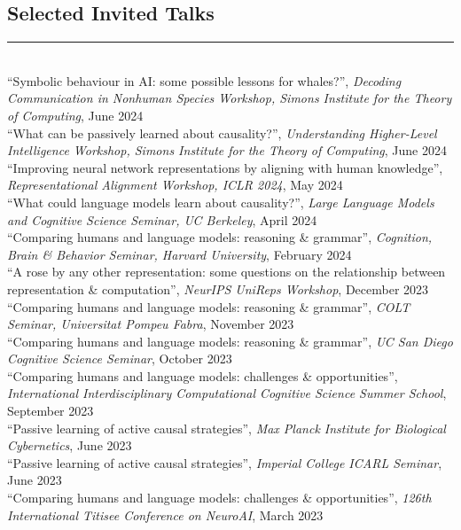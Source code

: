 \documentclass[margin]{res}
\begin{document}
\begin{resume}
{\vspace{1pt}\section{Selected Invited Talks} \vspace{-15pt} \rule{\textwidth}{0.5pt} \\[3pt]
{``Symbolic behaviour in AI: some possible lessons for whales?'',} \textit{Decoding Communication in Nonhuman Species Workshop, Simons Institute for the Theory of Computing}, June 2024\\[3pt]
{``What can be passively learned about causality?'',} \textit{Understanding Higher-Level Intelligence Workshop, Simons Institute for the Theory of Computing}, June 2024
{``Improving neural network representations by aligning with human knowledge'',} \textit{Representational Alignment Workshop, ICLR 2024}, May 2024\\[3pt] 
{``What could language models learn about causality?'',} \textit{Large Language Models and Cognitive Science Seminar, UC Berkeley}, April 2024\\[3pt] 
{``Comparing humans and language models: reasoning \& grammar'',} \textit{Cognition, Brain \& Behavior Seminar, Harvard University}, February 2024\\[3pt] 
{``A rose by any other representation: some questions on the relationship between representation \& computation'',} \textit{NeurIPS UniReps Workshop}, December 2023\\[3pt] 
{``Comparing humans and language models: reasoning \& grammar'',} \textit{COLT Seminar, Universitat Pompeu Fabra}, November 2023\\[3pt] 
{``Comparing humans and language models: reasoning \& grammar'',} \textit{UC San Diego Cognitive Science Seminar}, October 2023\\[3pt] 
{``Comparing humans and language models: challenges \& opportunities'',} \textit{International Interdisciplinary Computational Cognitive Science Summer School}, September 2023\\[3pt] 
{``Passive learning of active causal strategies'',} \textit{Max Planck Institute for Biological Cybernetics}, June 2023\\[3pt]
{``Passive learning of active causal strategies'',} \textit{Imperial College ICARL Seminar}, June 2023\\[3pt]
{``Comparing humans and language models: challenges \& opportunities'',} \textit{126th International Titisee Conference on NeuroAI}, March 2023\\[3pt] 
}
\end{resume}
\end{document}
